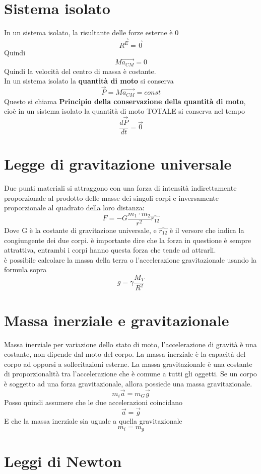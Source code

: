 \documentclass[a4paper]{report}
\begin{document}
  \section{Sistema isolato}
  In un sistema isolato, la risultante delle forze esterne è 0
  $$ \vec{R^E} = \vec{0}$$
  Quindi $$M \vec{a_{CM}} = 0$$
  Quindi la velocità del centro di massa è costante.\\
  In un sistema isolato la \textbf{quantità di moto} si conserva
  $$\vec{P} = M \vec{a_{CM}} = const$$
  Questo si chiama \textbf{Principio della conservazione della quantità di moto}, cioè in un sistema isolato la quantità di moto TOTALE si conserva nel tempo
  $$ \frac{d\vec{P}}{dt} = \vec{0}$$


  \section{Legge di gravitazione universale}
  Due punti materiali si attraggono con una forza di intensità indirettamente proporzionale al prodotto delle masse dei singoli corpi e inversamente proporzionale al quadrato della loro distanza:
  $$ F = - G \frac{m_1 \cdot m_2}{r^2} \hat{r_{12}} $$
  Dove G è la costante di gravitazione universale, e $\hat{r_{12}}$ è il versore che indica la congiungente dei due corpi. è importante dire che la forza in questione è sempre attrattiva, entrambi i corpi hanno questa forza che tende ad attrarli.\\
  è possibile calcolare la massa della terra o l'accelerazione gravitazionale usando la formula sopra
  $$g = \gamma \frac{M_T}{R^2}$$

  \section{Massa inerziale e gravitazionale}
  Massa inerziale per variazione dello stato di moto, l'accelerazione di gravità è una costante, non dipende dal moto del corpo. La massa inerziale è la capacità del corpo ad opporsi a sollecitazioni esterne. La massa gravitazionale è una costante di proporzionalità tra l'accelerazione che è comune a tutti gli oggetti. Se un corpo è soggetto ad una forza gravitazionale, allora possiede una massa gravitazionale.
  $$ m_i \vec{a} = m_G \vec{g} $$
  Posso quindi assumere che le due accelerazioni coincidano
  $$ \vec{a} = \vec{g} $$
  E che la massa inerziale sia uguale a quella gravitazionale
  $$ m_i = m_g$$

  \section{Leggi di Newton}
\end{document}
